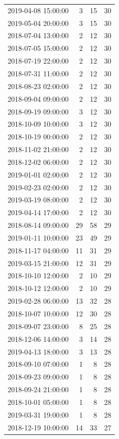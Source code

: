 \begin{tabular}{lrrr}
2019-04-08 15:00:00 & 3 & 15 & 30 \\
2019-05-04 20:00:00 & 3 & 15 & 30 \\
2018-07-04 13:00:00 & 2 & 12 & 30 \\
2018-07-05 15:00:00 & 2 & 12 & 30 \\
2018-07-19 22:00:00 & 2 & 12 & 30 \\
2018-07-31 11:00:00 & 2 & 12 & 30 \\
2018-08-23 02:00:00 & 2 & 12 & 30 \\
2018-09-04 09:00:00 & 2 & 12 & 30 \\
2018-09-19 09:00:00 & 3 & 12 & 30 \\
2018-10-09 10:00:00 & 3 & 12 & 30 \\
2018-10-19 00:00:00 & 2 & 12 & 30 \\
2018-11-02 21:00:00 & 2 & 12 & 30 \\
2018-12-02 06:00:00 & 2 & 12 & 30 \\
2019-01-01 02:00:00 & 2 & 12 & 30 \\
2019-02-23 02:00:00 & 2 & 12 & 30 \\
2019-03-19 08:00:00 & 2 & 12 & 30 \\
2019-04-14 17:00:00 & 2 & 12 & 30 \\
2018-08-14 09:00:00 & 29 & 58 & 29 \\
2019-01-11 10:00:00 & 23 & 49 & 29 \\
2018-11-17 04:00:00 & 11 & 31 & 29 \\
2019-03-15 21:00:00 & 12 & 31 & 29 \\
2018-10-10 12:00:00 & 2 & 10 & 29 \\
2018-10-12 12:00:00 & 2 & 10 & 29 \\
2019-02-28 06:00:00 & 13 & 32 & 28 \\
2018-10-07 10:00:00 & 12 & 30 & 28 \\
2018-09-07 23:00:00 & 8 & 25 & 28 \\
2018-12-06 14:00:00 & 3 & 14 & 28 \\
2019-04-13 18:00:00 & 3 & 13 & 28 \\
2018-09-10 07:00:00 & 1 & 8 & 28 \\
2018-09-23 09:00:00 & 1 & 8 & 28 \\
2018-09-24 21:00:00 & 1 & 8 & 28 \\
2018-10-01 05:00:00 & 1 & 8 & 28 \\
2019-03-31 19:00:00 & 1 & 8 & 28 \\
2018-12-19 10:00:00 & 14 & 33 & 27 \\

\end{tabular}
